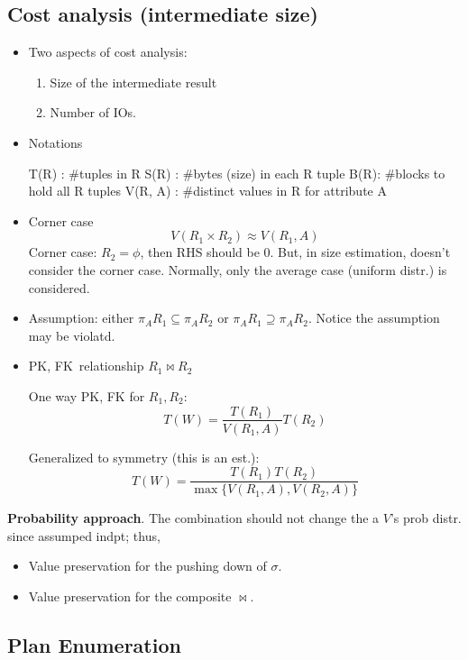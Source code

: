 \documentclass[a4paper]{report}
\begin{document}
\subsection{Cost analysis (intermediate size)}
\begin{itemize}
\item Two aspects of cost analysis:
\begin{enumerate}
\item Size of the intermediate result
\item Number of IOs.
\end{enumerate}
\item Notations
\begin{enumerate}
\treeitem T(R) : #tuples in R
\treeitem S(R) : #bytes (size) in each R tuple
\treeitem B(R): #blocks to hold all R tuples
\treeitem V(R, A) : #distinct values in R for attribute A
\end{enumerate}
\item Corner case
$$
V(R_1\times R_2) \approx V(R_1, A)
$$
Corner case: $R_2=\phi$, then RHS should be 0. But, in size estimation, doesn't consider the corner case. Normally, only the average case (uniform distr.) is considered.
\end{itemize}
\begin{itemize}
\item Assumption: either $\pi_{A}R_1 \subseteq \pi_{A}R_2$ or $\pi_{A}R_1 \supseteq \pi_{A}R_2$.
Notice the assumption may be violatd.
\item \textbraceleft PK, FK\textbraceright\ relationship $R_1\bowtie R_2$

One way PK, FK for $R_1, R_2$:
$$
T(W) = \frac{T(R_1)}{V(R_1, A)} T(R_2)
$$

Generalized to symmetry (this is an est.):
$$
T(W) = \frac{T(R_1)T(R_2)}{\max\{V(R_1, A), V(R_2, A)\}}
$$
\end{itemize}

\textbf{Probability approach}. The combination should not change the a $V$'s prob distr. since assumped indpt; thus,\begin{itemize}
\item Value preservation for the pushing down of $\sigma$.
\item Value preservation for the composite $\bowtie$.
\end{itemize}
\subsection{Plan Enumeration}
\end{document}
